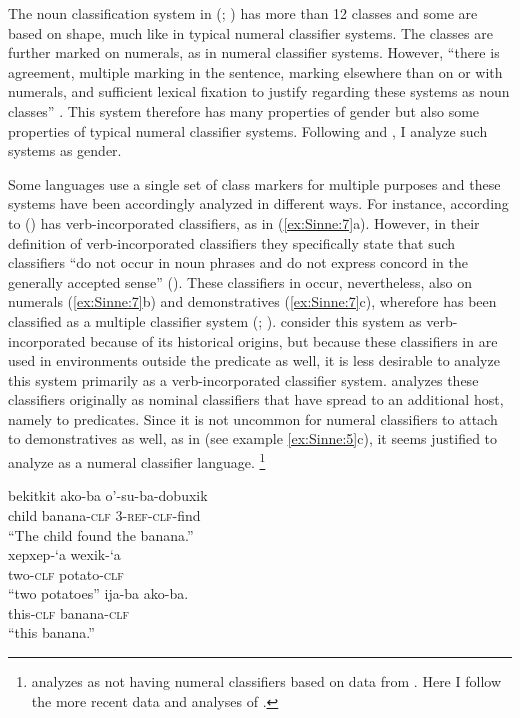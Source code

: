 \documentclass[output=collectionpaper]{langsci/langscibook}
\begin{document}
The noun classification system in  (; ) has more than 12 classes and some are based on shape, much like in typical numeral classifier systems. The classes are further marked on numerals, as in numeral classifier systems. However, ``there is agreement, multiple marking in the sentence, marking elsewhere than on or with numerals, and sufficient lexical fixation to justify regarding these systems as noun classes'' \citep[136]{Nichols1992}. This system therefore has many properties of gender but also some properties of typical numeral classifier systems. Following \citet{Nichols1992} and \citet{Corbett2013}, I analyze such systems as gender.

Some languages use a single set of class markers for multiple purposes and these systems have been accordingly analyzed in different ways. For instance, according to \citet[261]{Derbyshire1990}  () has verb\hyp{}incorporated classifiers, as in (\ref{ex:Sinne:7}a). However, in their definition of verb-incorporated classifiers they specifically state that such classifiers ``do not occur in noun phrases and do not express concord in the generally accepted sense'' (\citealt[245]{Derbyshire1990}). These classifiers in  occur, nevertheless, also on numerals (\ref{ex:Sinne:7}b) and demonstratives (\ref{ex:Sinne:7}c), wherefore  has been classified as a multiple classifier system (\citealt{Aikhenvald2000}; \citealt{Passer2016a}). \citet{Derbyshire1990} consider this system as verb-incorporated because of its historical origins, but because these classifiers in  are used in environments outside the predicate as well, it is less desirable to analyze this system primarily as a verb-incorporated classifier system. \citet{Passer2016a} analyzes these classifiers originally as nominal classifiers that have spread to an additional host, namely to predicates. Since it is not uncommon for numeral classifiers to attach to demonstratives as well, as in   (see example \ref{ex:Sinne:5}c), it seems justified to analyze  as a numeral classifier language.%
\footnote{\citet{Gil2013} analyzes  as not having numeral classifiers based on data from \citet{Derbyshire1990}. Here I follow the more recent data and analyses of \citet{Passer2016a}.}

\ea
\label{ex:Sinne:7}
\begin{xlist}
\ex
\gll bekitkit ako-ba o'-su-ba-dobuxik\\
child banana-\textsc{clf} \textsc{3-ref-clf}{}-find \\
\glt ``The child found the banana.''\\
\ex
\gll xepxep-`a wexik-`a\\
two-\textsc{clf} potato-\textsc{clf} \\
\glt ``two potatoes''
\ex
\gll ija-ba ako-ba.\\
this-\textsc{clf} banana-\textsc{clf}\\
\glt ``this banana.''\\
\end{xlist}
\z
\end{document}
